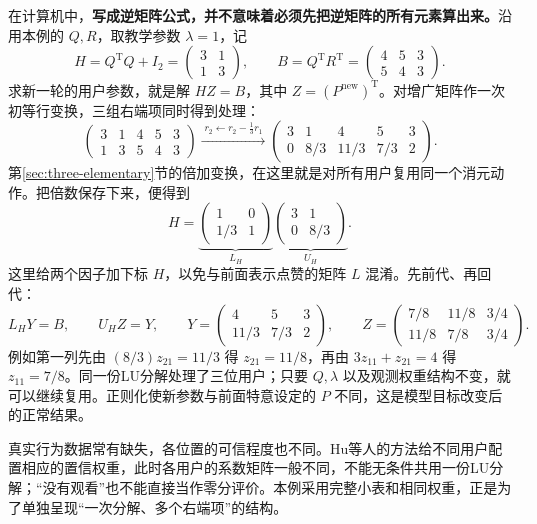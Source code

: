 \documentclass[a4paper,12pt,twoside,openany,fontset=none]{ctexbook}
\numberwithin{equation}{chapter}
\begin{document}
在计算机中，\textbf{写成逆矩阵公式，并不意味着必须先把逆矩阵的所有元素算出来。}沿用本例的 $Q,R$，取教学参数 $\lambda=1$，记
\[
 H=Q^{\mathrm T}Q+I_2=\begin{pmatrix}3&1\\1&3\end{pmatrix},\qquad
 B=Q^{\mathrm T}R^{\mathrm T}=\begin{pmatrix}4&5&3\\5&4&3\end{pmatrix}.
\]
求新一轮的用户参数，就是解 $HZ=B$，其中 $Z=(P^{\mathrm{new}})^{\mathrm T}$。对增广矩阵作一次初等行变换，三组右端项同时得到处理：
\[
 \left(\begin{array}{cc|ccc}3&1&4&5&3\\1&3&5&4&3\end{array}\right)
 \xrightarrow{\;r_2\leftarrow r_2-\frac13r_1\;}
 \left(\begin{array}{cc|ccc}3&1&4&5&3\\0&8/3&11/3&7/3&2\end{array}\right).
\]
第\ref{sec:three-elementary}节的倍加变换，在这里就是对所有用户复用同一个消元动作。把倍数保存下来，便得到
\[
 H=\underbrace{\begin{pmatrix}1&0\\1/3&1\end{pmatrix}}_{L_H}
   \underbrace{\begin{pmatrix}3&1\\0&8/3\end{pmatrix}}_{U_H}.
\]
这里给两个因子加下标 $H$，以免与前面表示点赞的矩阵 $L$ 混淆。先前代、再回代：
\[
 L_HY=B,\qquad U_HZ=Y,\qquad
 Y=\begin{pmatrix}4&5&3\\11/3&7/3&2\end{pmatrix},\qquad
 Z=\begin{pmatrix}7/8&11/8&3/4\\11/8&7/8&3/4\end{pmatrix}.
\]
例如第一列先由 $(8/3)z_{21}=11/3$ 得 $z_{21}=11/8$，再由 $3z_{11}+z_{21}=4$ 得 $z_{11}=7/8$。同一份LU分解处理了三位用户；只要 $Q,\lambda$ 以及观测权重结构不变，就可以继续复用。正则化使新参数与前面特意设定的 $P$ 不同，这是模型目标改变后的正常结果。

真实行为数据常有缺失，各位置的可信程度也不同。Hu等人的方法给不同用户配置相应的置信权重，此时各用户的系数矩阵一般不同，不能无条件共用一份LU分解；“没有观看”也不能直接当作零分评价。\nobreak\cite{hu-als-2008}本例采用完整小表和相同权重，正是为了单独呈现“一次分解、多个右端项”的结构。
\end{document}
